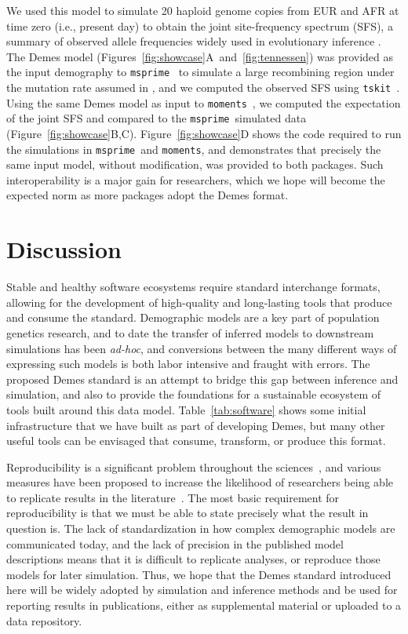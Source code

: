 \documentclass[11pt]{article}
\newcommand{\msprime}[0]{\texttt{msprime}}
\newcommand{\moments}[0]{\texttt{moments}}
\newcommand{\tskit}[0]{\texttt{tskit}}
\begin{document}
We used this model to simulate 20 haploid genome copies from EUR and AFR
at time zero (i.e., present day) to obtain the joint site-frequency spectrum
(SFS), a summary of observed allele frequencies widely used in evolutionary
inference
\citep{bustamante2001directional,gutenkunst2009inferring,tennessen2012evolution,
jouganous2017inferring,kamm2017efficient,kim2017inference}.
The Demes model (Figures~\ref{fig:showcase}A~and~\ref{fig:tennessen}) was
provided as the input demography to \msprime\ \citep{baumdicker2021-iu} to
simulate a large recombining region under the mutation rate assumed in
\citet{tennessen2012evolution}, and we computed the observed SFS using \tskit\
\citep{ralph2020efficiently}. Using the same Demes model as input to \moments\
\citep{jouganous2017inferring}, we computed the expectation of the joint SFS
and compared to the \msprime\ simulated data (Figure~\ref{fig:showcase}B,C).
Figure~\ref{fig:showcase}D shows the code required to run the
simulations in \msprime\ and \moments, and demonstrates that
precisely the same input model, without modification, was provided to both packages.
Such interoperability is a major gain for researchers, which we
hope will become the expected norm as more packages adopt the Demes
format.

\section*{Discussion}
Stable and healthy software ecosystems require standard interchange
formats, allowing for the development of high-quality and long-lasting
tools that produce and consume the standard.
Demographic models are a key part of population genetics research,
and to date the transfer of inferred models to downstream simulations
has been \textit{ad-hoc}, and conversions between the many different ways
of expressing such models is both labor intensive and fraught with errors.
The proposed Demes standard is an attempt to bridge this gap
between inference and simulation, and also to provide the foundations
for a sustainable ecosystem of tools built around this data model.
Table~\ref{tab:software} shows some initial infrastructure that we have
built as part of developing Demes, but many other useful tools
can be envisaged that consume, transform, or produce this format.

Reproducibility is a significant problem throughout the
sciences~\citep{baker20161}, and various measures have been
proposed to increase the likelihood of researchers being
able to replicate results in the
literature~\citep{munafo2017manifesto}. The most basic requirement
for reproducibility is that we must be able to state precisely what
the result in question is. The lack of standardization in how
complex demographic models are communicated today, and the lack of
precision in the published model descriptions means that it is difficult
to replicate analyses, or reproduce those models for later simulation.
Thus, we hope that the Demes standard introduced here will be widely adopted
by simulation and inference methods and be used for reporting results in
publications, either as supplemental material or uploaded to a data repository.
\end{document}

